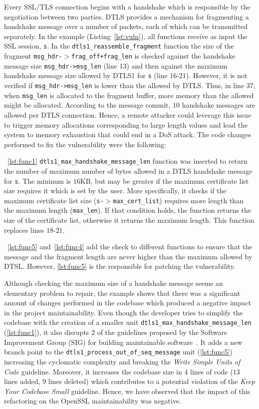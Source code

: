 \documentclass[10pt,conference]{IEEEtran}
\begin{document}
Every SSL/TLS connection begins with a handshake which is responsible by the negotiation between two parties. 
DTLS provides a mechanism for fragmenting a handshake message over a number of packets, each of which can be 
transmitted separately. In the example (Listing~\ref{lst:vuln}), all functions receive as input the
SSL session, \texttt{s}. In the \texttt{dtls1\_reassemble\_fragment} function the size of the fragment \texttt{msg\_hdr-$>$frag\_off+frag\_len} is checked against the handshake message size \texttt{msg\_hdr->msg\_len} 
(line 13) and then against the maximum handshake message size allowed by DTLS1 for \texttt{s} (line 16-21). 
However, it is not verified if \texttt{msg\_hdr->msg\_len} is lower than the allowed by DTLS. Thus, in line 37,
when \texttt{msg\_len} is allocated to the fragment buffer, more memory than the allowed might be allocated. According to the message commit, $10$ handshake messages are allowed per DTLS connection. Hence, a remote attacker could leverage this issue to trigger
memory allocations corresponding to large length values and lead the system to memory exhaustion that could end
in a DoS attack. The code changes performed to fix the vulnerability were the following:

~\ref{lst:func1} \texttt{dtls1\_max\_handshake\_message\_len} function was inserted to return the number of 
maximum number of bytes allowed in a DTLS handshake message for \texttt{s}. The mininum is $16$KB, but may be greater 
if the maximum certificate list size requires it which is set by the user. More specifically, it checks if the 
maximum certificate list size
(\texttt{s-$>$max\_cert\_list}) requires more length than the maximum length
(\texttt{max\_len}). If that condition holds, the function returns the size of
the certificate list, otherwise it returns the maximum length. This function replaces lines $18$-$21$.

~\ref{lst:func5} and~\ref{lst:func4} add the check to different functions to ensure that the message 
and the fragment length are never higher than the maximum allowed by DTSL. However, \ref{lst:func5} is
the responsible for patching the vulnerability.

Although checking the maximum size of a handshake message seems an elementary problem to
repair, the example shows that there was a significant amount of changes
performed in the codebase which produced a negative impact in the project
maintainability. Even though the developer tries to simplify the codebase with
the creation of a smaller unit \texttt{dtls1\_max\_handshake\_message\_len} (\ref{lst:func1}), it
also disrupts $2$ of the guidelines proposed by the Software Improvement Group
(SIG) for building maintainable software~\cite{Visser:2016:OREILLY}. It adds a
new branch point to the \texttt{dtls1\_process\_out\_of\_seq\_message} unit
(\ref{lst:func5}) increasing the cyclomatic complexity and breaking the
\emph{Write Simple Units of Code} guideline. Moreover, it increases the codebase
size in $4$ lines of code ($13$ lines added, $9$ lines deleted) which contributes
to a potential violation of the
\emph{Keep Your Codebase Small} guideline. Hence, we have observed that the
impact of this refactoring on the OpenSSL maintainability was negative.
\end{document}
